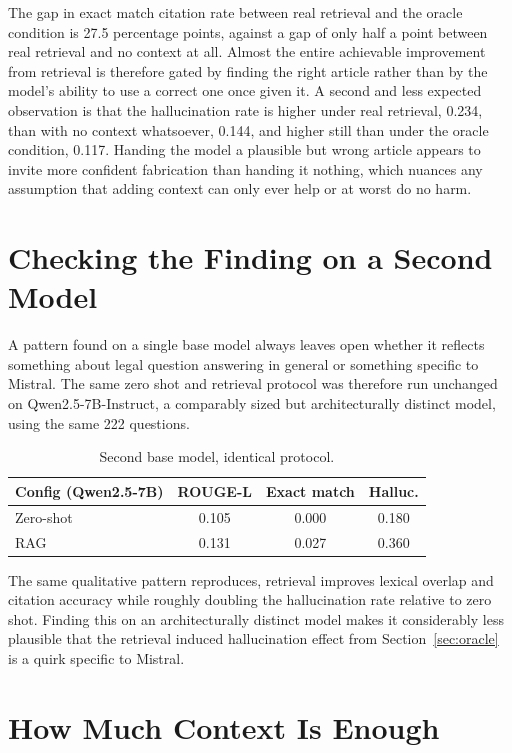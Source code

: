 \documentclass[11pt, a4paper]{article}
\begin{document}
The gap in exact match citation rate between real retrieval and the oracle condition is 27.5 percentage points, against a gap of only half a point between real retrieval and no context at all. Almost the entire achievable improvement from retrieval is therefore gated by finding the right article rather than by the model's ability to use a correct one once given it. A second and less expected observation is that the hallucination rate is higher under real retrieval, 0.234, than with no context whatsoever, 0.144, and higher still than under the oracle condition, 0.117. Handing the model a plausible but wrong article appears to invite more confident fabrication than handing it nothing, which nuances any assumption that adding context can only ever help or at worst do no harm.

\section{Checking the Finding on a Second Model}

A pattern found on a single base model always leaves open whether it reflects something about legal question answering in general or something specific to Mistral. The same zero shot and retrieval protocol was therefore run unchanged on Qwen2.5-7B-Instruct, a comparably sized but architecturally distinct model, using the same 222 questions.

\begin{table}[H]
\centering
\small
\begin{tabular}{lccc}
\toprule
\textbf{Config (Qwen2.5-7B)} & \textbf{ROUGE-L} & \textbf{Exact match} & \textbf{Halluc.} \\
\midrule
Zero-shot & 0.105 & 0.000 & 0.180 \\
RAG & 0.131 & 0.027 & 0.360 \\
\bottomrule
\end{tabular}
\caption{Second base model, identical protocol.}
\label{tab:qwen}
\end{table}

The same qualitative pattern reproduces, retrieval improves lexical overlap and citation accuracy while roughly doubling the hallucination rate relative to zero shot. Finding this on an architecturally distinct model makes it considerably less plausible that the retrieval induced hallucination effect from Section~\ref{sec:oracle} is a quirk specific to Mistral.

\section{How Much Context Is Enough}
\end{document}
